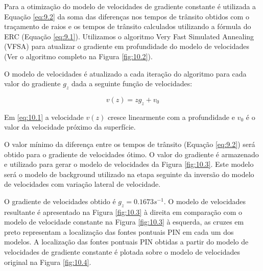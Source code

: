 Para a otimização do modelo de velocidades de gradiente constante
é utilizada a Equação \ref{eq:9.2} da soma das
diferenças nos tempos de trânsito obtidos com o traçamento de raios e os tempos de trânsito calculados utilizando a fórmula do ERC (Equação \ref{eq:9.1}). Utilizamos o algoritmo Very Fast Simulated Annealing (VFSA) para atualizar o gradiente em profundidade do modelo de velocidades (Ver o algoritmo completo na
Figura \ref{fig:10.2}).

O modelo de velocidades é atualizado a cada iteração do algoritmo para cada valor do gradiente $g_z$
dada a seguinte função de velocidades:

\begin{equation}
\label{eq:10.1}
v(z)=z g_z+v_0
\end{equation}

Em \ref{eq:10.1} a velocidade $v(z)$ cresce linearmente com a profundidade e $v_0$
é o valor da velocidade próximo da superfície.

O valor mínimo da diferença entre os tempos de trânsito (Equação \ref{eq:9.2})
será obtido para o gradiente de velocidades ótimo.
O valor do gradiente é armazenado e utilizado para gerar o modelo de velocidades
da Figura \ref{fig:10.3}. Este modelo será o modelo de background utilizado na etapa seguinte
da inversão do modelo de velocidades com variação lateral de velocidade.

O gradiente de velocidades obtido é $g_z=0.1673 s^{-1}$. O modelo de velocidades resultante é apresentado na
Figura \ref{fig:10.3} à direita em comparação com o modelo de velocidade constante na Figura \ref{fig:10.3}
à esquerda, as cruzes em preto representam a localização das fontes pontuais PIN em cada um dos modelos.
A localização das fontes pontuais PIN obtidas a partir do modelo de velocidades de gradiente constante
é plotada sobre o modelo de velocidades original na Figura \ref{fig:10.4}.

